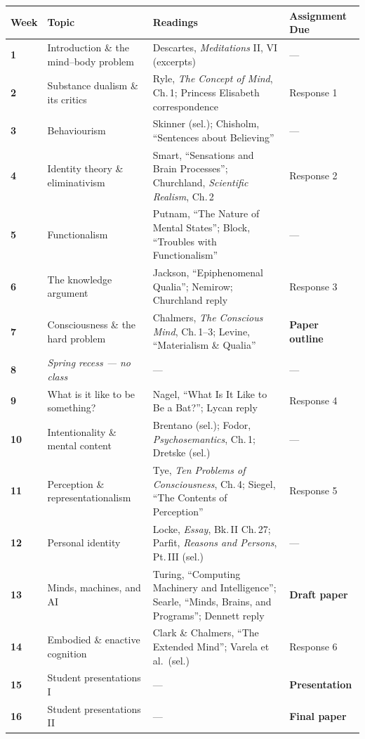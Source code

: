 \documentclass[11pt, a4paper]{article}
\begin{document}
{\small
\begin{tabularx}{\linewidth}{@{}
  >{\bfseries\color{accent}}l
  >{\raggedright\arraybackslash}p{4.2cm}
  >{\raggedright\arraybackslash}X
  >{\raggedright\arraybackslash}p{3.2cm}
  @{}}
\toprule
\normalfont\bfseries\color{black}Week &
\normalfont\bfseries\color{black}Topic &
\normalfont\bfseries\color{black}Readings &
\normalfont\bfseries\color{black}Assignment Due \\
\midrule
1  & Introduction \& the mind–body problem
   & Descartes, \textit{Meditations} II, VI (excerpts)
   & — \\[4pt]
2  & Substance dualism \& its critics
   & Ryle, \textit{The Concept of Mind}, Ch.\,1; Princess Elisabeth correspondence
   & Response 1 \\[4pt]
3  & Behaviourism
   & Skinner (sel.); Chisholm, ``Sentences about Believing''
   & — \\[4pt]
4  & Identity theory \& eliminativism
   & Smart, ``Sensations and Brain Processes''; Churchland, \textit{Scientific Realism}, Ch.\,2
   & Response 2 \\[4pt]
5  & Functionalism
   & Putnam, ``The Nature of Mental States''; Block, ``Troubles with Functionalism''
   & — \\[4pt]
6  & The knowledge argument
   & Jackson, ``Epiphenomenal Qualia''; Nemirow; Churchland reply
   & Response 3 \\[4pt]
7  & Consciousness \& the hard problem
   & Chalmers, \textit{The Conscious Mind}, Ch.\,1–3; Levine, ``Materialism \& Qualia''
   & \textbf{Paper outline} \\[4pt]
8  & \textit{Spring recess — no class}
   & —
   & — \\[4pt]
9  & What is it like to be something?
   & Nagel, ``What Is It Like to Be a Bat?''; Lycan reply
   & Response 4 \\[4pt]
10 & Intentionality \& mental content
   & Brentano (sel.); Fodor, \textit{Psychosemantics}, Ch.\,1; Dretske (sel.)
   & — \\[4pt]
11 & Perception \& representationalism
   & Tye, \textit{Ten Problems of Consciousness}, Ch.\,4; Siegel, ``The Contents of Perception''
   & Response 5 \\[4pt]
12 & Personal identity
   & Locke, \textit{Essay}, Bk.\,II Ch.\,27; Parfit, \textit{Reasons and Persons}, Pt.\,III (sel.)
   & — \\[4pt]
13 & Minds, machines, and AI
   & Turing, ``Computing Machinery and Intelligence''; Searle, ``Minds, Brains, and Programs''; Dennett reply
   & \textbf{Draft paper} \\[4pt]
14 & Embodied \& enactive cognition
   & Clark \& Chalmers, ``The Extended Mind''; Varela et al.\ (sel.)
   & Response 6 \\[4pt]
15 & Student presentations I
   & —
   & \textbf{Presentation} \\[4pt]
16 & Student presentations II
   & —
   & \textbf{Final paper} \\
\bottomrule
\end{tabularx}
}
\end{document}
